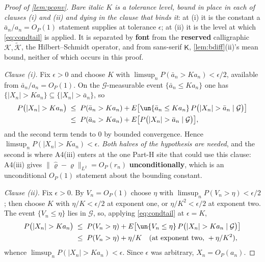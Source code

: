 \begin{proof}[Proof of \cref{lem:pconv}]
\emph{Bare italic $K$ is a tolerance level, bound in place in each of clauses (i) and (ii) and dying in
the clause that binds it}: at (i) it is the constant a $\bar a_n/a_n=O_P(1)$ statement supplies
at tolerance $\epsilon$; at (ii) it is the level at which \eqref{eq:condtail} is applied. It is
separated by \textbf{font} from the \textbf{reserved} calligraphic $\mathcal K,\tilde{\mathcal K}$, the
Hilbert--Schmidt operator, and from sans-serif $\mathsf K$, \cref{lem:bdiff}(ii)'s mean bound, neither of
which occurs in this proof.

\emph{Clause (i).} Fix $\epsilon>0$ and choose $K$ with $\limsup_nP(\bar a_n>Ka_n)<\epsilon/2$, available
from $\bar a_n/a_n=O_P(1)$. On the $\mathcal G$-measurable event $\{\bar a_n\le Ka_n\}$ one has
$\{|X_n|>Ka_n\}\subseteq\{|X_n|>\bar a_n\}$, so
\begin{align*}
P\big(|X_n|>Ka_n\big)
&\;\le\;P(\bar a_n>Ka_n)
+E\big[\un\{\bar a_n\le Ka_n\}\,P\big(|X_n|>\bar a_n\mid\mathcal G\big)\big] \\
&\;\le\;P(\bar a_n>Ka_n)+E\big[P\big(|X_n|>\bar a_n\mid\mathcal G\big)\big],
\end{align*}
and the second term tends to $0$ by bounded convergence. Hence
$\limsup_nP(|X_n|>Ka_n)<\epsilon$. \emph{Both halves of the hypothesis are needed}, and the second is
where A4(iii) enters at the one Part-H site that could use this clause: A4(iii) gives
$\|\hat\varrho-\varrho\|_{L^{2}}=O_P(r_n)$ \textbf{unconditionally}, which is an unconditional $O_P(1)$
statement about the bounding constant.

\emph{Clause (ii).} Fix $\epsilon>0$. By $V_n=O_P(1)$ choose $\eta$ with
$\limsup_nP(V_n>\eta)<\epsilon/2$; then choose $K$ with $\eta/K<\epsilon/2$ at exponent one, or
$\eta/K^{2}<\epsilon/2$ at exponent two. The event $\{V_n\le\eta\}$ lies in $\mathcal G$, so, applying
\eqref{eq:condtail} at $\epsilon=K$,
\begin{align*}
P\big(|X_n|>Ka_n\big)
&\;\le\;P(V_n>\eta)+E\big[\un\{V_n\le\eta\}\,P\big(|X_n|>Ka_n\mid\mathcal G\big)\big] \\
&\;\le\;P(V_n>\eta)+\eta/K \quad\text{(at exponent two, }+\eta/K^{2}\text{)},
\end{align*}
whence $\limsup_nP(|X_n|>Ka_n)<\epsilon$. Since $\epsilon$ was arbitrary, $X_n=O_P(a_n)$.


\end{proof}
